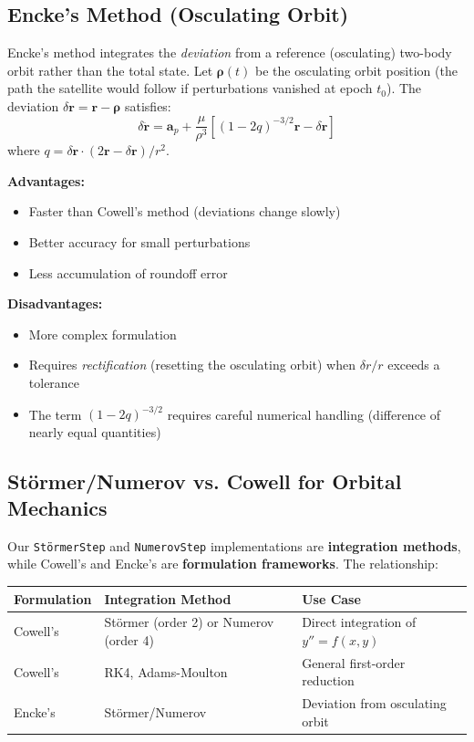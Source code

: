 \documentclass[11pt]{article}
\begin{document}
\subsection{Encke's Method (Osculating Orbit)}
\label{ssec:encke}

Encke's method \cite{Bate1971,Hintz2015} integrates the \textit{deviation} from a reference (osculating) two-body orbit rather than the total state. Let $\mathbf{\rho}(t)$ be the osculating orbit position (the path the satellite would follow if perturbations vanished at epoch $t_0$). The deviation $\delta\mathbf{r} = \mathbf{r} - \mathbf{\rho}$ satisfies:
\begin{equation}
\delta\ddot{\mathbf{r}} = \mathbf{a}_p + \frac{\mu}{\rho^3}\left[(1 - 2q)^{-3/2}\mathbf{r} - \delta\mathbf{r}\right]
\end{equation}
where $q = \delta\mathbf{r} \cdot (2\mathbf{r} - \delta\mathbf{r}) / r^2$.

\textbf{Advantages:}
\begin{itemize}
\item Faster than Cowell's method (deviations change slowly)
\item Better accuracy for small perturbations
\item Less accumulation of roundoff error
\end{itemize}

\textbf{Disadvantages:}
\begin{itemize}
\item More complex formulation
\item Requires \textit{rectification} (resetting the osculating orbit) when $\delta r/r$ exceeds a tolerance
\item The term $(1 - 2q)^{-3/2}$ requires careful numerical handling (difference of nearly equal quantities)
\end{itemize}

\subsection{Störmer/Numerov vs. Cowell for Orbital Mechanics}
\label{ssec:stormer-vs-cowell}

Our \texttt{StörmerStep} and \texttt{NumerovStep} implementations are \textbf{integration methods}, while Cowell's and Encke's are \textbf{formulation frameworks}. The relationship:

\begin{center}
\begin{tabular}{lll}
\toprule
\textbf{Formulation} & \textbf{Integration Method} & \textbf{Use Case} \\
\midrule
Cowell's & Störmer (order 2) or Numerov (order 4) & Direct integration of $y'' = f(x,y)$ \\
Cowell's & RK4, Adams-Moulton & General first-order reduction \\
Encke's & Störmer/Numerov & Deviation from osculating orbit \\
\bottomrule
\end{tabular}
\end{center}
\end{document}
